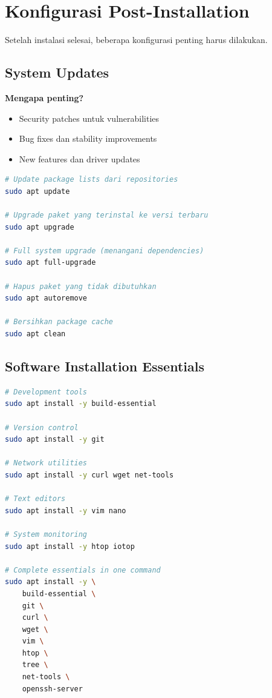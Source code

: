 
\section{Konfigurasi Post-Installation}
\label{sec:post-installation}

Setelah instalasi selesai, beberapa konfigurasi penting harus dilakukan.

\subsection{System Updates}

\textbf{Mengapa penting?}
\begin{itemize}
    \item Security patches untuk vulnerabilities
    \item Bug fixes dan stability improvements
    \item New features dan driver updates
\end{itemize}

\begin{lstlisting}[language=bash, caption={Update sistem Ubuntu/Debian}]
# Update package lists dari repositories
sudo apt update

# Upgrade paket yang terinstal ke versi terbaru
sudo apt upgrade

# Full system upgrade (menangani dependencies)
sudo apt full-upgrade

# Hapus paket yang tidak dibutuhkan
sudo apt autoremove

# Bersihkan package cache
sudo apt clean
\end{lstlisting}

\subsection{Software Installation Essentials}

\begin{lstlisting}[language=bash, caption={Install essential development tools}]
# Development tools
sudo apt install -y build-essential

# Version control
sudo apt install -y git

# Network utilities
sudo apt install -y curl wget net-tools

# Text editors
sudo apt install -y vim nano

# System monitoring
sudo apt install -y htop iotop

# Complete essentials in one command
sudo apt install -y \
    build-essential \
    git \
    curl \
    wget \
    vim \
    htop \
    tree \
    net-tools \
    openssh-server
\end{lstlisting}

